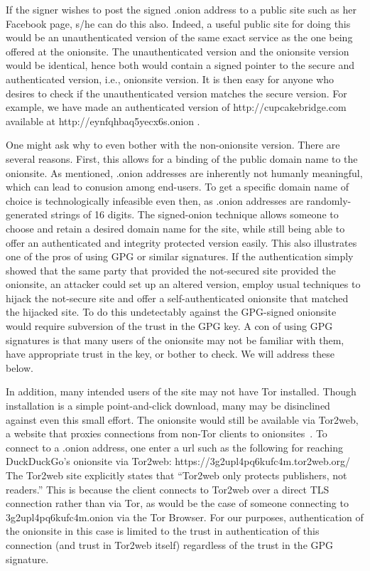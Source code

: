 \documentclass[10pt, conference, compsocconf]{styles/IEEEtran}
\begin{document}
If the signer wishes to post the signed .onion address to a public
site such as her Facebook page, s/he can do this also. Indeed, a
useful public site for doing this would be an unauthenticated version
of the same exact service as the one being offered at the onionsite.
The unauthenticated version and the onionsite version would be
identical, hence both would contain a signed pointer to the secure and
authenticated version, i.e., onionsite version. It is then
easy for anyone who desires to check if the unauthenticated version
matches the secure version. For example, we have made an authenticated
version of http://cupcakebridge.com available at http://eynfqhbaq5yecx6s.onion .

One might ask why to even bother with the non-onionsite version. There
are several reasons. First, this allows for a binding of the public
domain name to the onionsite. As mentioned, .onion addresses are
inherently not humanly meaningful, which can lead to conusion among 
end-users.  To get a specific domain name of choice is technologically
infeasible even then, as .onion addresses are randomly-generated strings 
of 16 digits. The signed-onion technique
allows someone to choose and retain a desired domain name for the
site, while still being able to offer an authenticated and integrity
protected version easily. This also illustrates one of the pros
of using GPG or similar signatures. If the authentication simply
showed that the same party that provided the not-secured site
provided the onionsite, an attacker could set up an altered version,
employ usual techniques to hijack the not-secure site and offer
a self-authenticated onionsite that matched the hijacked site.
To do this undetectably against the GPG-signed onionsite would require
subversion of the trust in the GPG key. A con of using GPG signatures
is that many users of the onionsite may not be familiar with them,
have appropriate trust in the key, or bother to check. We will address
these below.

In addition, many intended users of the site may not have Tor installed.
Though installation is a simple point-and-click download, many may be
disinclined against even this small effort. The onionsite would still
be available via Tor2web, a website that proxies connections from
non-Tor clients to onionsites~\cite{tor2web}.  To connect to a .onion
address, one enter a url such as the following for reaching
DuckDuckGo's onionsite via Tor2web:
https://3g2upl4pq6kufc4m.tor2web.org/ The Tor2web site explicitly
states that ``Tor2web only protects publishers, not readers.'' This is
because the client connects to Tor2web over a direct TLS connection
rather than via Tor, as would be the case of someone connecting to
3g2upl4pq6kufc4m.onion via the Tor Browser.  For our purposes,
authentication of the onionsite in this case is limited to the trust
in authentication of this connection (and trust in Tor2web itself)
regardless of the trust in the GPG signature.
\end{document}
